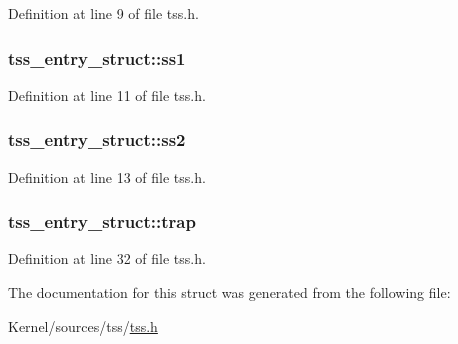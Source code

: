 Definition at line 9 of file tss.h.

\hypertarget{structtss__entry__struct_a787088e6043f61a03622b25ef1816e51}{
\subsubsection[{ss1}]{ {\bf tss\_\-entry\_\-struct::ss1}}}
\label{structtss__entry__struct_a787088e6043f61a03622b25ef1816e51}


Definition at line 11 of file tss.h.

\hypertarget{structtss__entry__struct_a64f26bd76bf74688d440c1d7ae06a286}{
\subsubsection[{ss2}]{ {\bf tss\_\-entry\_\-struct::ss2}}}
\label{structtss__entry__struct_a64f26bd76bf74688d440c1d7ae06a286}


Definition at line 13 of file tss.h.

\hypertarget{structtss__entry__struct_a5a9931a6adc20ad9f15b1266cbace3fd}{
\subsubsection[{trap}]{ {\bf tss\_\-entry\_\-struct::trap}}}
\label{structtss__entry__struct_a5a9931a6adc20ad9f15b1266cbace3fd}


Definition at line 32 of file tss.h.



The documentation for this struct was generated from the following file:\begin{DoxyCompactItemize}
\item 
Kernel/sources/tss/\hyperlink{tss_8h}{tss.h}\end{DoxyCompactItemize}

